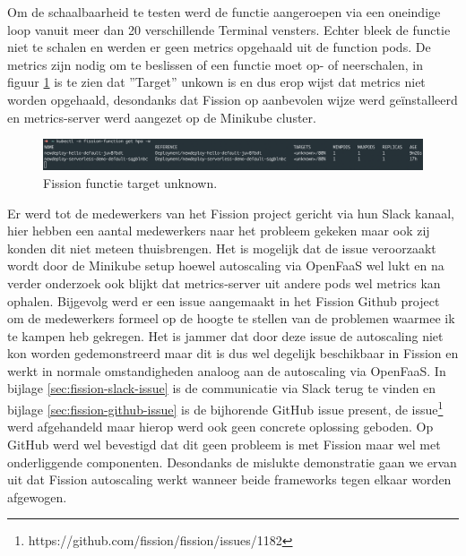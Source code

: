 Om de schaalbaarheid te testen werd de functie  aangeroepen via een oneindige loop vanuit meer dan 20 verschillende Terminal vensters. Echter bleek de functie niet te schalen en werden er geen metrics opgehaald uit de function pods. De metrics zijn nodig om te beslissen of een functie moet op- of neerschalen, in figuur \ref{fig:fission-scalability-issue} is te zien dat ''Target'' unkown is en dus erop wijst dat metrics niet worden opgehaald, desondanks dat Fission op aanbevolen wijze werd geïnstalleerd en metrics-server werd aangezet op de Minikube cluster.
\begin{figure}
    \includegraphics[width=1\textwidth]{img/fission-scalability-issue.png}
    \caption{Fission functie target unknown.}
    \label{fig:fission-scalability-issue}  
\end{figure}

Er werd tot de medewerkers van het Fission project gericht via hun Slack kanaal, hier hebben een aantal medewerkers naar het probleem gekeken maar ook zij konden dit niet meteen thuisbrengen. Het is mogelijk dat de issue veroorzaakt wordt door de Minikube setup hoewel autoscaling via OpenFaaS wel lukt en na verder onderzoek ook blijkt dat metrics-server uit andere pods wel metrics kan ophalen. Bijgevolg werd er een issue aangemaakt in het Fission Github project om de medewerkers formeel op de hoogte te stellen van de problemen waarmee ik te kampen heb gekregen. Het is jammer dat door deze issue de autoscaling niet kon worden gedemonstreerd maar dit is dus wel degelijk beschikbaar in Fission en werkt in normale omstandigheden analoog aan de autoscaling via OpenFaaS. In bijlage \ref{sec:fission-slack-issue} is de communicatie via Slack terug te vinden en bijlage \ref{sec:fission-github-issue} is de bijhorende GitHub issue present, de issue\footnote{https://github.com/fission/fission/issues/1182} werd afgehandeld maar hierop werd ook geen concrete oplossing geboden. Op GitHub werd wel bevestigd dat dit geen probleem is met Fission maar wel met onderliggende componenten. Desondanks de mislukte demonstratie gaan we ervan uit dat Fission autoscaling werkt wanneer beide frameworks tegen elkaar worden afgewogen.

